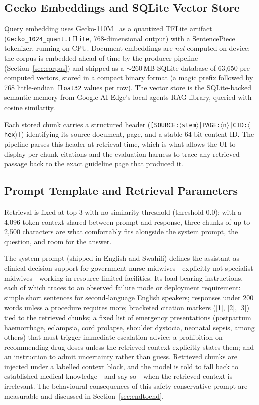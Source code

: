 \subsection{Gecko Embeddings and SQLite Vector Store}

Query embedding uses Gecko-110M~\cite{lee2024gecko} as a quantized
TFLite artifact (\texttt{Gecko\_1024\_quant.tflite}, 768-dimensional
output) with a SentencePiece tokenizer, running on CPU. Document
embeddings are \emph{not} computed on-device: the corpus is embedded
ahead of time by the producer pipeline (Section~\ref{sec:corpus}) and
shipped as a $\sim$260\,MB SQLite database of 63{,}650 pre-computed
vectors, stored in a compact binary format (a magic prefix followed by
768 little-endian \texttt{float32} values per row). The vector store is
the SQLite-backed semantic memory from Google AI Edge's local-agents RAG
library, queried with cosine similarity.

Each stored chunk carries a structured header
(\texttt{[SOURCE:$\langle$stem$\rangle$|PAGE:$\langle$n$\rangle$|CID:$\langle$hex$\rangle$]})
identifying its source document, page, and a stable 64-bit content ID.
The pipeline parses this header at retrieval time, which is what allows
the UI to display per-chunk citations and the evaluation harness to
trace any retrieved passage back to the exact guideline page that
produced it.

\subsection{Prompt Template and Retrieval Parameters}

Retrieval is fixed at top-3 with no similarity threshold (threshold
0.0): with a 4{,}096-token context shared between prompt and response,
three chunks of up to 2{,}500 characters are what comfortably fits
alongside the system prompt, the question, and room for the answer.

The system prompt (shipped in English and Swahili) defines the assistant
as clinical decision support for government nurse-midwives---explicitly
not specialist midwives---working in resource-limited facilities. Its
load-bearing instructions, each of which traces to an observed
failure mode or deployment requirement: simple short sentences for
second-language English speakers; responses under 200 words unless a
procedure requires more; bracketed citation markers ([1], [2], [3])
tied to the retrieved chunks; a fixed list of emergency presentations
(postpartum haemorrhage, eclampsia, cord prolapse, shoulder dystocia,
neonatal sepsis, among others) that must trigger immediate escalation
advice; a prohibition on recommending drug doses unless the retrieved
context explicitly states them; and an instruction to admit uncertainty
rather than guess. Retrieved chunks are injected under a labelled
context block, and the model is told to fall back to established
medical knowledge---and say so---when the retrieved context is
irrelevant. The behavioural consequences of this
safety-conservative prompt are measurable and discussed in
Section~\ref{sec:endtoend}.

